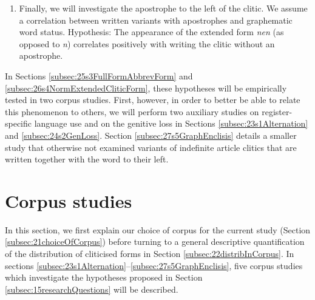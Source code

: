 \begin{enumerate}
	This is because \textit{nen} fulfills the minimal requirements to be a graphematic word: it is a well-formed graphematic syllable with a vowel grapheme (cf. \citealt[197]{Fuhrhop2008}).\footnote{
		For further discussion of the graphematic syllable, see \citet{FuhrhopBuchmann2009}.}
	Thus, we expect that the tendency to fill out the short form \textit{n} to \textit{nen} is purely formally conditioned, rather than functionally (which it would be if it had a preference for particular number or case).
	Hypothesis: Independent from the expected frequent appearance of the form \textit{nen} in the accusative masculine (given the full form \textit{einen}), the appearance of \textit{nen} in nominative masculine and nominative and accusative neuter is in principle equal.
	\item Finally, we will investigate the apostrophe to the left of the clitic.
	We assume a correlation between written variants with apostrophes and graphematic word status.
	Hypothesis: The appearance of the extended form \textit{nen} (as opposed to \textit{n}) correlates positively with writing the clitic without an apostrophe.	
\end{enumerate}

In Sections \ref{subsec:25s3FullFormAbbrevForm} and \ref{subsec:26s4NormExtendedCliticForm}, these hypotheses will be empirically tested in two corpus studies.
First, however, in order to better be able to relate this phenomenon to others, we will perform two auxiliary studies on register-specific language use and on the genitive loss in Sections \ref{subsec:23s1Alternation} and \ref{subsec:24s2GenLoss}.
Section \ref{subsec:27s5GraphEnclisis} details a smaller study that otherwise not examined variants of indefinite article clitics that are written together with the word to their left.

\section{Corpus studies}
\label{sec:2corpusStudies}

In this section, we first explain our choice of corpus for the current study (Section \ref{subsec:21choiceOfCorpus}) before turning to a general descriptive quantification of the distribution of cliticised forms in Section \ref{subsec:22distribInCorpus}.
In sections \ref{subsec:23s1Alternation}--\ref{subsec:27s5GraphEnclisis}, five corpus studies which investigate the hypotheses proposed in Section \ref{subsec:15researchQuestions} will be described.

